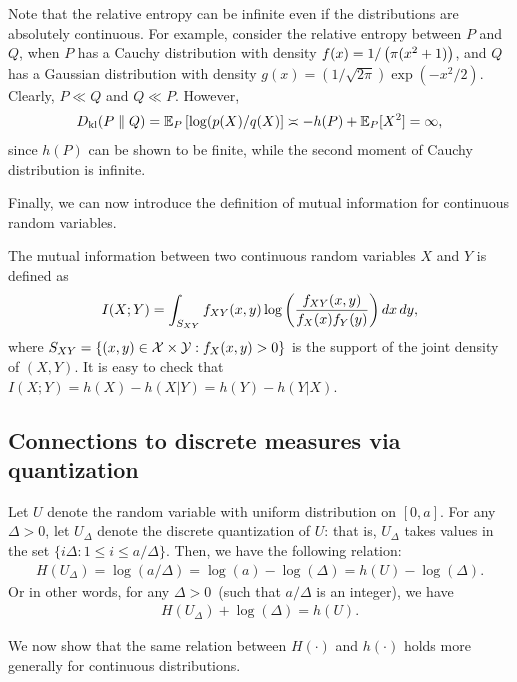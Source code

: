         \begin{example}
            Note that the relative entropy can be infinite even if the distributions are absolutely continuous. For example, consider the relative entropy between $P$ and $Q$, when $P$ has a Cauchy distribution with density $f(x) = 1/\left( \pi(x^2 + 1)\right)$, and $Q$ has a Gaussian distribution with density $g(x) = (1/\sqrt{2\pi})\exp(-x^2/2)$. Clearly, $P \ll Q$ and $Q\ll P$. However, 
            \begin{align}
                D_{\text{kl}}(P\parallel Q) = \mathbb{E}_P\left[  \log(p(X)/q(X) \right] \asymp -h(P) + \mathbb{E}_P[X^2] = \infty, 
            \end{align}
            since $h(P)$ can be shown to be finite, while the second moment of Cauchy distribution is infinite. 
        \end{example}

        Finally, we can now introduce the definition of mutual information for continuous random variables. 
        \begin{definition}
            \label{def:mi-cont}
            The mutual information between two continuous random variables $X$ and $Y$ is defined as 
            \begin{align}
                I(X;Y) = \int_{S_{XY}} f_{XY}(x, y) \log \left( \frac{ f_{XY}(x, y)}{f_X(x) f_Y(y)} \right) dx\, dy, 
            \end{align}
            where $S_{XY} = \{(x,y) \in \mathcal{X} \times \mathcal{Y}: f_X(x, y) > 0\}$ is the support of the joint density of $(X, Y)$. 
            It is easy to check that $I(X;Y) = h(X) - h(X|Y) = h(Y) - h(Y|X)$. 
        \end{definition}


        \subsection{Connections to discrete measures via quantization} 
            \label{subsec:info-measures-quantization} 

            \begin{example}
                Let $U$ denote the random variable with uniform distribution on $[0, a]$. For any $\Delta >0$, let $U_\Delta$ denote the discrete quantization of $U$: that is, $U_\Delta$ takes values in the set $\{i\Delta: 1 \leq i \leq a/\Delta\}$.  Then, we have the following relation: 
                \begin{align}
                    H(U_\Delta) = \log(a/\Delta) = \log (a) - \log(\Delta) = h(U) - \log(\Delta). 
                \end{align}
                Or in other words, for any $\Delta>0$~(such that $a/\Delta$ is an integer), we have 
                \begin{align}
                    H(U_\Delta) + \log(\Delta) = h(U).  
                \end{align}
            \end{example}
            We now show that the same relation between $H(\cdot)$ and $h(\cdot)$ holds more generally for continuous distributions. 

